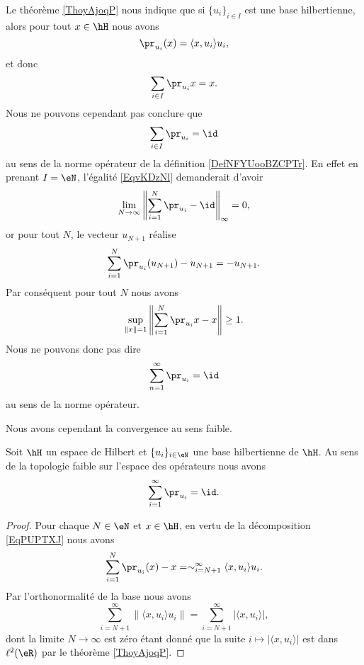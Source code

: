 Le théorème \ref{ThoyAjoqP} nous indique que si \( \{ u_i \}_{i\in I}\) est une base hilbertienne, alors pour tout \( x\in \hH\) nous avons
\begin{equation}
    \pr_{u_i}(x)=\langle x, u_i\rangle u_i,
\end{equation}
et donc
\begin{equation}
    \sum_{i\in I}\pr_{u_i}x=x.
\end{equation}
Nous ne pouvons cependant pas conclure que
\begin{equation}    \label{EqvKDzNl}
    \sum_{i\in I}\pr_{u_i}=\id
\end{equation}
au sens de la norme opérateur de la définition \ref{DefNFYUooBZCPTr}. En effet en prenant \( I=\eN\), l'égalité \eqref{EqvKDzNl} demanderait d'avoir
\begin{equation}
    \lim_{N\to \infty} \left\| \sum_{i=1}^N\pr_{u_i}-\id \right\|_{\infty}=0,
\end{equation}
or pour tout \( N\), le vecteur \( u_{N+1}\) réalise
\begin{equation}
    \sum_{i=1}^N\pr_{u_i}(u_{N+1})-u_{N+1}=-u_{N+1}.
\end{equation}
Par conséquent pour tout \( N\) nous avons
\begin{equation}
    \sup_{\| x \|=1}\left\| \sum_{i=1}^N\pr_{u_i}x-x \right\|\geq 1.
\end{equation}
Nous ne pouvons donc pas dire
\begin{equation}
    \sum_{n=1}^{\infty}\pr_{u_i}=\id
\end{equation}
au sens de la norme opérateur.

Nous avons cependant la convergence au sens faible.
\begin{proposition}
    Soit \( \hH\) un espace de Hilbert et \( \{ u_i \}_{i\in \eN}\) une base hilbertienne de \( \hH\). Au sens de la topologie faible sur l'espace des opérateurs nous avons
    \begin{equation}
        \sum_{i=1}^{\infty}\pr_{u_i}=\id.
    \end{equation}
\end{proposition}

\begin{proof}
    Pour chaque \( N\in \eN\) et \( x\in\hH\), en vertu de la décomposition \eqref{EqPUPTXJ} nous avons
    \begin{equation}
        \sum_{i=1}^N\pr_{u_i}(x)-x=\sim_{i=N+1}^{\infty}\langle x, u_i\rangle u_i.
    \end{equation}
    Par l'orthonormalité de la base nous avons
    \begin{equation}
        \sum_{i=N+1}^{\infty}\| \langle x, u_i\rangle u_i \|=\sum_{i=N+1}^{\infty}| \langle x, u_i\rangle  |,
    \end{equation}
    dont la limite \( N\to \infty\) est zéro étant donné que la suite \( i\mapsto| \langle x, u_i\rangle  |\) est dans \( \ell^2(\eR)\) par le théorème \ref{ThoyAjoqP}.
\end{proof}

